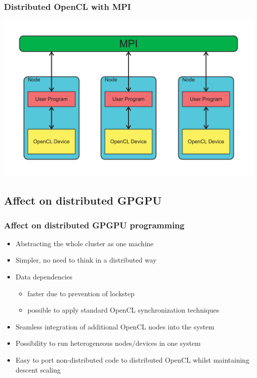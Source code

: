 \documentclass{beamer}
\begin{document}
\begin{frame}
    \frametitle{Distributed OpenCL with MPI}
    \begin{center}
        \includegraphics[width=\textwidth]{../2014-09-25_gputalk/mpi_opencl.pdf}
    \end{center}
\end{frame}


\subsection{Affect on distributed GPGPU}

\begin{frame}
    \frametitle{Affect on distributed GPGPU programming}
    \begin{itemize}
        \item Abstracting the whole cluster as one machine
        \item Simpler, no need to think in a distributed way
        \item Data dependencies
        \begin{itemize}
            \item faster due to prevention of lockstep
            \item possible to apply standard OpenCL synchronization techniques
        \end{itemize}
        \item Seamless integration of additional OpenCL nodes into the system
        \item Possibility to run heterogeneous nodes/devices in one system
        \item Easy to port non-distributed code to distributed OpenCL whilst
              maintaining descent scaling
    \end{itemize}
\end{frame}
\end{document}
